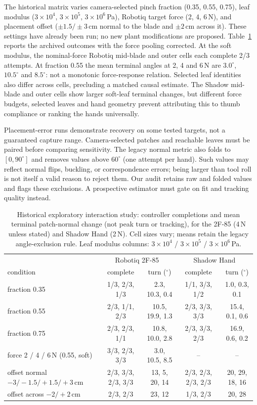\documentclass[letterpaper, 10 pt, conference]{ieeeconf}
\begin{document}
The historical matrix varies camera-selected pinch fraction (0.35, 0.55, 0.75),
leaf modulus ($3{\times}10^4$, $3{\times}10^5$, $3{\times}10^6$\,Pa), Robotiq target force
(2, 4, 6\,N), and placement offset ($\pm1.5/\pm3$\,cm normal to the blade and $\pm2$\,cm
across it). These settings have already been run; no new plant modifications are proposed.
Table~\ref{tab:interaction} reports the archived outcomes with the force pooling corrected.
At the soft modulus, the nominal-force Robotiq mid-blade and outer cells each complete
2/3 attempts. At fraction 0.55 the mean terminal angles at 2, 4 and 6\,N are
$3.0^\circ$, $10.5^\circ$ and $8.5^\circ$: not a monotonic force-response relation.
Selected leaf identities also differ across cells, precluding a matched causal estimate.
The Shadow mid-blade and outer cells show larger soft-leaf terminal changes, but different
force budgets, selected leaves and hand geometry prevent attributing this to thumb
compliance or ranking the hands universally.

Placement-error runs demonstrate recovery on some tested targets, not a guaranteed
capture range. Camera-selected patches and reachable leaves must be paired before
comparing sensitivity. The legacy normal metric also folds to $[0,90^\circ]$ and removes
values above $60^\circ$ (one attempt per hand). Such values may reflect normal flips,
buckling, or correspondence errors; being larger than tool roll is not itself a valid
reason to reject them. Our audit retains raw and folded values and flags these exclusions.
A prospective estimator must gate on fit and tracking quality instead.

\begin{table}[t]
\caption{Historical exploratory interaction study: controller completions and mean terminal
patch-normal change (not peak turn or tracking), for the 2F-85 (4\,N unless stated) and
Shadow Hand (2\,N). Cell sizes vary; means retain the legacy angle-exclusion rule.
Leaf modulus columns: $3{\times}10^4$ / $3{\times}10^5$ / $3{\times}10^6$\,Pa.}
\label{tab:interaction}
\centering\scriptsize
\setlength{\tabcolsep}{4pt}
\begin{tabular}{@{}lcccc@{}}
\toprule
 & \multicolumn{2}{c}{Robotiq 2F-85} & \multicolumn{2}{c}{Shadow Hand} \\
condition & complete & turn ($^\circ$) & complete & turn ($^\circ$) \\
\midrule
fraction 0.35 & 1/3, 2/3, 1/3 & 2.3, 10.3, 0.4 & 1/1, 3/3, 1/2 & 1.0, 0.3, 0.1 \\
fraction 0.55 & 2/3, 1/1, 2/3 & 10.5, 19.9, 1.3 & 2/3, 3/3, 3/3 & 15.4, 0.1, 0.6 \\
fraction 0.75 & 2/3, 2/3, 1/1 & 10.8, 10.0, 2.8 & 2/3, 3/3, 2/3 & 16.9, 0.6, 0.2 \\
force 2 / 4 / 6\,N (0.55, soft) & 3/3, 2/3, 3/3 & 3.0, 10.5, 8.5 & -- & -- \\
offset normal $-3/-1.5/+1.5/+3$\,cm & 2/3, 3/3, 2/3, 3/3 & 13, 5, 20, 14 & 2/3, 2/3, 2/3, 2/3 & 20, 29, 18, 16 \\
offset across $-2/+2$\,cm & 2/3, 2/3 & 23, 12 & 1/3, 2/3 & 20, 28 \\
\bottomrule
\end{tabular}
\end{table}
\end{document}
